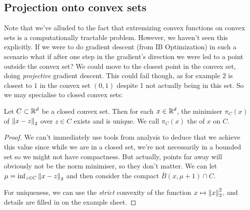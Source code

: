 \documentclass[11pt]{scrartcl}
\begin{document}
\subsection{Projection onto convex sets}

Note that we've alluded to the fact that extremizing convex functions on convex sets is a computationally tractable problem. However, we haven't seen this explicitly. If we were to do gradient descent (from IB Optimization) in such a scenario what if after one step in the gradient's direction we were led to a point outside the convex set? We could move to the closest point in the convex set, doing \textit{projective} gradient descent. This could fail though, as for example $2$ is closest to $1$ in the convex set $(0,1)$ despite 1 not actually being in this set. So we may specialise to closed convex sets:

\begin{theorem}
Let $C \subset \mathbb R^d$ be a closed convex set. Then for each $x \in \mathbb R^d$, the minimiser $\pi_C(x)$ of $\left\lVert x-z\right\rVert_2$ over $z\in C$ exists and is unique. We call $\pi_C(x)$ the  of $x$ on $C$.

\begin{proof}
We can't immediately use tools from analysis to deduce that we achieve this value since while we are in a closed set, we're not necessarily in a bounded set so we might not have compactness. But actually, points far away will obviously not be the norm minimiser, so they don't matter. We can let $\mu = \inf_{z \in C} \left\lVert x-z\right\rVert_2$ and then consider the compact $\bar{B}(x, \mu + 1) \cap C$. 

For uniqueness, we can use the \textit{strict} convexity of the function $x \mapsto \left\lVert x\right\rVert_2^2$, and details are filled in on the example sheet.
\end{proof}
\end{theorem}
\end{document}
